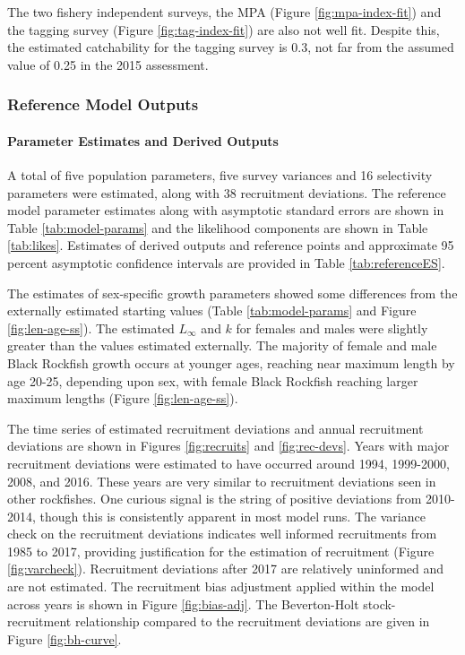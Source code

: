 \documentclass[11pt,
  letterpaper,
]{article}
\begin{document}
The two fishery independent surveys, the MPA (Figure \ref{fig:mpa-index-fit}) and the tagging survey (Figure \ref{fig:tag-index-fit}) are also not well fit. Despite this, the estimated catchability for the tagging survey is 0.3, not far from the assumed value of 0.25 in the 2015 assessment.

\hypertarget{reference-model-outputs}{%
\subsubsection{Reference Model Outputs}\label{reference-model-outputs}}

\hypertarget{parameter-estimates-and-derived-outputs}{%
\paragraph{Parameter Estimates and Derived Outputs}\label{parameter-estimates-and-derived-outputs}}

A total of five population parameters, five survey variances and 16 selectivity parameters were estimated, along with 38 recruitment deviations. The reference model parameter estimates along with asymptotic standard errors are shown in Table \ref{tab:model-params} and the likelihood components are shown in Table \ref{tab:likes}. Estimates of derived outputs and reference points and approximate 95 percent asymptotic confidence intervals are provided in Table \ref{tab:referenceES}.

The estimates of sex-specific growth parameters showed some differences from the externally estimated starting values (Table \ref{tab:model-params} and Figure \ref{fig:len-age-ss}). The estimated \(L_{\infty}\) and \(k\) for females and males were slightly greater than the values estimated externally. The majority of female and male Black Rockfish growth occurs at younger ages, reaching near maximum length by age 20-25, depending upon sex, with female Black Rockfish reaching larger maximum lengths (Figure \ref{fig:len-age-ss}).

The time series of estimated recruitment deviations and annual recruitment deviations are shown in Figures \ref{fig:recruits} and \ref{fig:rec-devs}. Years with major recruitment deviations were estimated to have occurred around 1994, 1999-2000, 2008, and 2016. These years are very similar to recruitment deviations seen in other rockfishes. One curious signal is the string of positive deviations from 2010-2014, though this is consistently apparent in most model runs. The variance check on the recruitment deviations indicates well informed recruitments from 1985 to 2017, providing justification for the estimation of recruitment (Figure \ref{fig:varcheck}). Recruitment deviations after 2017 are relatively uninformed and are not estimated. The recruitment bias adjustment applied within the model across years is shown in Figure \ref{fig:bias-adj}. The Beverton-Holt stock-recruitment relationship compared to the recruitment deviations are given in Figure \ref{fig:bh-curve}.
\end{document}
